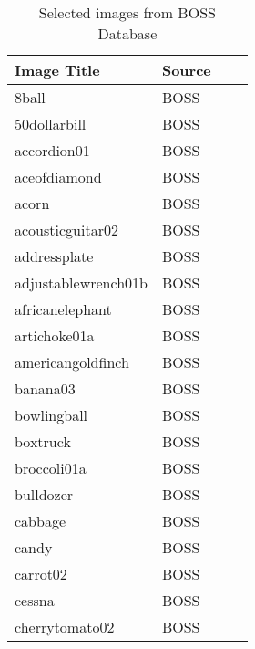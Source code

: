 \begin{table}[t!]
	\begin{tabular}{llll}
		\hline
		Image Title & Source	\\ [2ex] 
		\hline
		8ball    	& BOSS		\\ [0.5ex]
		50dollarbill    	& BOSS		\\ [0.5ex]
		accordion01    	& BOSS		\\ [0.5ex]
		aceofdiamond    	& BOSS		\\ [0.5ex]
		acorn    	& BOSS		\\ [0.5ex]
		acousticguitar02    	& BOSS		\\ [0.5ex]
		addressplate    	& BOSS		\\ [0.5ex]
		adjustablewrench01b    	& BOSS		\\ [0.5ex]
		africanelephant    	& BOSS		\\ [0.5ex]
		artichoke01a    	& BOSS		\\ [0.5ex]
		americangoldfinch    	& BOSS		\\ [0.5ex]
		banana03    	& BOSS		\\ [0.5ex]
		bowlingball    	& BOSS		\\ [0.5ex]
		boxtruck    	& BOSS		\\ [0.5ex]
		broccoli01a    	& BOSS		\\ [0.5ex]
		bulldozer    	& BOSS		\\ [0.5ex]
		cabbage    	& BOSS		\\ [0.5ex]
		candy    	& BOSS		\\ [0.5ex]
		carrot02    	& BOSS		\\ [0.5ex]
		cessna    	& BOSS		\\ [0.5ex]
		cherrytomato02    	& BOSS		\\ [0.5ex]
		 \hline
	\end{tabular}
	\caption{Selected images from BOSS Database}
	\label{table:boss-words}
\end{table}